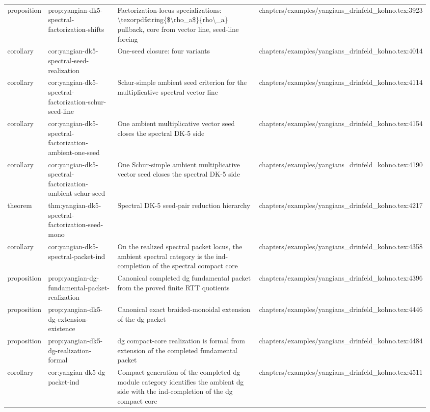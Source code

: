 \documentclass[11pt]{article}
\begin{document}
\begin{longtable}{L{0.10\textwidth}L{0.26\textwidth}L{0.42\textwidth}L{0.22\textwidth}}
proposition & prop:yangian-dk5-spectral-factorization-shifts & Factorization-locus specializations: \textbackslash{}texorpdfstring\{\$\textbackslash{}rho\_a\$\}\{rho\textbackslash{}\_a\} pullback, core from vector line, seed-line forcing & chapters/examples/yangians\_drinfeld\_kohno.tex:3923\\
corollary & cor:yangian-dk5-spectral-seed-realization & One-seed closure: four variants & chapters/examples/yangians\_drinfeld\_kohno.tex:4014\\
corollary & cor:yangian-dk5-spectral-factorization-schur-seed-line & Schur-simple ambient seed criterion for the multiplicative spectral vector line & chapters/examples/yangians\_drinfeld\_kohno.tex:4114\\
corollary & cor:yangian-dk5-spectral-factorization-ambient-one-seed & One ambient multiplicative vector seed closes the spectral DK-5 side & chapters/examples/yangians\_drinfeld\_kohno.tex:4154\\
corollary & cor:yangian-dk5-spectral-factorization-ambient-schur-seed & One Schur-simple ambient multiplicative vector seed closes the spectral DK-5 side & chapters/examples/yangians\_drinfeld\_kohno.tex:4190\\
theorem & thm:yangian-dk5-spectral-factorization-seed-mono & Spectral DK-5 seed-pair reduction hierarchy & chapters/examples/yangians\_drinfeld\_kohno.tex:4217\\
corollary & cor:yangian-dk5-spectral-packet-ind & On the realized spectral packet locus, the ambient spectral category is the ind-completion of the spectral compact core & chapters/examples/yangians\_drinfeld\_kohno.tex:4358\\
proposition & prop:yangian-dg-fundamental-packet-realization & Canonical completed dg fundamental packet from the proved finite RTT quotients & chapters/examples/yangians\_drinfeld\_kohno.tex:4396\\
proposition & prop:yangian-dk5-dg-extension-existence & Canonical exact braided-monoidal extension of the dg packet & chapters/examples/yangians\_drinfeld\_kohno.tex:4446\\
proposition & prop:yangian-dk5-dg-realization-formal & dg compact-core realization is formal from extension of the completed fundamental packet & chapters/examples/yangians\_drinfeld\_kohno.tex:4484\\
corollary & cor:yangian-dk5-dg-packet-ind & Compact generation of the completed dg module category identifies the ambient dg side with the ind-completion of the dg compact core & chapters/examples/yangians\_drinfeld\_kohno.tex:4511\\

\end{longtable}
\end{document}
